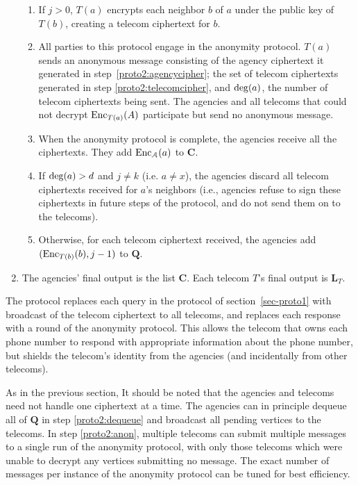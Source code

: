 \begin{enumerate}
\begin{enumerate}
\item \label{proto2:telecomcipher} If $j>0$, $T(a)$ encrypts each neighbor $b$ of $a$ under the public key of $T(b)$, creating a telecom ciphertext for $b$.

\item \label{proto2:anon} All parties to this protocol engage in the anonymity protocol. $T(a)$ sends an anonymous message consisting of the agency ciphertext it generated in step~\ref{proto2:agencycipher}; the set of telecom ciphertexts generated in step \ref{proto2:telecomcipher}, and $\operatorname{deg}(a)$, the number of telecom ciphertexts being sent. The agencies and all telecoms that could not decrypt $\operatorname{Enc}_{T(a)}(A)$ participate but send no anonymous message.

\item When the anonymity protocol is complete, the agencies receive all the ciphertexts. They add $\operatorname{Enc}_\mathcal{A}(a)$ to $\mathbf{C}$.

\item If $\operatorname{deg}(a)>d$ and $j\neq k$ (i.e. $a\neq x$), the agencies discard all telecom ciphertexts received for $a$'s neighbors (i.e., agencies refuse to sign these ciphertexts in future steps of the protocol, and do not send them on to the telecoms).

\item Otherwise, for each telecom ciphertext received, the agencies add $(\operatorname{Enc}_{T(b)}(b), j-1)$ to $\mathbf{Q}$.

\end{enumerate}

\item The agencies' final output is the list $\mathbf{C}$. Each telecom $T$'s final output is $\mathbf{L}_T$.

\end{enumerate}



The protocol replaces each query in the protocol of section~\ref{sec-proto1} with broadcast of the telecom ciphertext to all telecoms, and replaces each response with a round of the anonymity protocol. This allows the telecom that owns each phone number to respond with appropriate information about the phone number, but shields the telecom's identity from the agencies (and incidentally from other telecoms).



As in the previous section, It should be noted that the agencies and telecoms need not handle one ciphertext at a time. The agencies can in principle dequeue all of $\mathbf{Q}$ in step \ref{proto2:dequeue} and broadcast all pending vertices to the telecoms. In step \ref{proto2:anon}, multiple telecoms can submit multiple messages to a single run of the anonymity protocol, with only those telecoms which were unable to decrypt any vertices submitting no message. The exact number of messages per instance of the anonymity protocol can be tuned for best efficiency.




